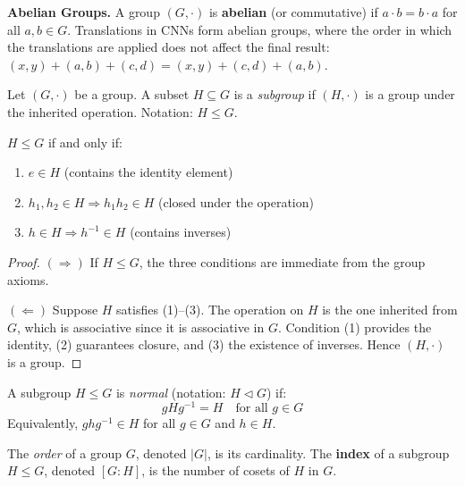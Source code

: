 \textbf{Abelian Groups.}\label{rem:grupos_abelianos} A group $(G, \cdot)$ is \textbf{abelian} (or commutative) if $a \cdot b = b \cdot a$ for all $a, b \in G$. Translations in \glspl{CNN} form abelian groups, where the order in which the translations are applied does not affect the final result: $(x,y) + (a,b) + (c,d) = (x,y) + (c,d) + (a,b)$.

\begin{definition}[Subgroup]\label{def:subgrupo}
Let $(G, \cdot)$ be a group. A subset $H \subseteq G$ is a \textit{subgroup} if $(H, \cdot)$ is a group under the inherited operation. Notation: $H \leq G$.
\end{definition}

\begin{proposition}\label{prop:criterio_subgrupo}
$H \leq G$ if and only if:
\begin{enumerate}
    \item $e \in H$ (contains the identity element)
    \item $h_1, h_2 \in H \Rightarrow h_1 h_2 \in H$ (closed under the operation)
    \item $h \in H \Rightarrow h^{-1} \in H$ (contains inverses)
\end{enumerate}
\end{proposition}

\begin{proof}
$(\Rightarrow)$ If $H \leq G$, the three conditions are immediate from the group axioms.

$(\Leftarrow)$ Suppose $H$ satisfies (1)--(3). The operation on $H$ is the one inherited from $G$, which is associative since it is associative in $G$. Condition (1) provides the identity, (2) guarantees closure, and (3) the existence of inverses. Hence $(H, \cdot)$ is a group.
\end{proof}

\begin{definition}\label{def:subgrupo_normal}
A subgroup $H \leq G$ is \textit{normal} (notation: $H \triangleleft G$) if:
\begin{equation}
gHg^{-1} = H \quad \text{for all } g \in G
\end{equation}
Equivalently, $ghg^{-1} \in H$ for all $g \in G$ and $h \in H$.
\end{definition}

\begin{definition}\label{def:orden_grupo}
The \textit{order} of a group $G$, denoted $|G|$, is its cardinality. The \textbf{index} of a subgroup $H \leq G$, denoted $[G:H]$, is the number of cosets of $H$ in $G$.
\end{definition}

